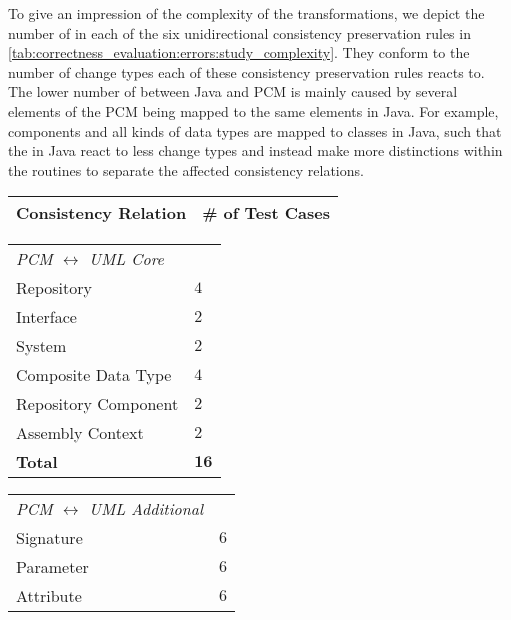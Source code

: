 To give an impression of the complexity of the transformations, we depict the number of \reactions in each of the six unidirectional consistency preservation rules in \autoref{tab:correctness_evaluation:errors:study_complexity}.
They conform to the number of change types each of these consistency preservation rules reacts to.
The lower number of \reactions between Java and \gls{PCM} is mainly caused by several elements of the \gls{PCM} being mapped to the same elements in Java.
For example, components and all kinds of data types are mapped to classes in Java, such that the \reactions in Java react to less change types and instead make more distinctions within the routines to separate the affected consistency relations.

\begin{table}
    \centering
    \small
    \renewcommand{\arraystretch}{1.2}
    \begin{tabular}{L{13em}C{8em}}
        \toprule
        \textbf{Consistency Relation} & \textbf{\# of Test Cases} \\
        \midrule
    \end{tabular}
    \begin{tabular}{L{13em}C{8em}}
        \textit{\gls{PCM} $\leftrightarrow$ \gls{UML} Core}\\\addlinespace[0.3em]
        Repository              & $4$ \\
        Interface               & $2$ \\
        System                  & $2$ \\
        Composite Data Type     & $4$ \\
        Repository Component    & $2$ \\
        Assembly Context        & $2$ \\%
        \rowcolor{\headinglinecolor}
        \textbf{Total}          & $\mathbf{16}$ \\
        \midrule
    \end{tabular}
    \begin{tabular}{L{13em}C{8em}}
        \textit{\gls{PCM} $\leftrightarrow$ \gls{UML} Additional}\\\addlinespace[0.3em]
        Signature       & $6$ \\
        Parameter       & $6$ \\
        Attribute       & $6$ \\

\end{tabular}
\end{table}
